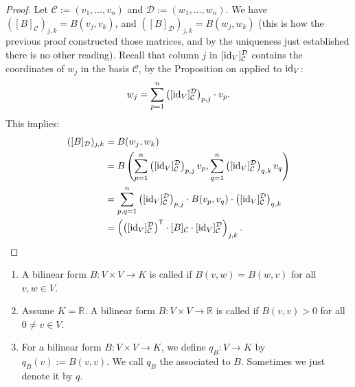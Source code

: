 \begin{proof}
Let $\mathcal{C} := (v_1, \dots, v_n)$ and $\mathcal{D} := (w_1, \dots, w_n)$. We have $([B]_{\mathcal{C}})_{j,k} = B(v_j, v_k)$, and $([B]_{\mathcal{D}})_{j,k} = B(w_j, w_k)$ (this is how the previous proof constructed those matrices, and by the uniqueness just established there is no other reading). Recall that column $j$ in $[\operatorname{id}_V]_{\mathcal{C}}^{\mathcal{D}}$ contains the coordinates of $w_j$ in the basis $\mathcal{C}$, by the Proposition on  applied to $\operatorname{id}_V$:
\[
w_j = \sum_{p=1}^n \left([\operatorname{id}_V]_{\mathcal{C}}^{\mathcal{D}}\right)_{p,j} \cdot v_p.
\]
This implies:
\begin{align*}
([B]_{\mathcal{D}})_{j,k} &= B(w_j, w_k) \\
&= B\left(\sum_{p=1}^n \left([\operatorname{id}_V]_{\mathcal{C}}^{\mathcal{D}}\right)_{p,j} v_p, \sum_{q=1}^n \left([\operatorname{id}_V]_{\mathcal{C}}^{\mathcal{D}}\right)_{q,k} v_q\right) \\
&= \sum_{p,q=1}^n \left([\operatorname{id}_V]_{\mathcal{C}}^{\mathcal{D}}\right)_{p,j} \cdot B(v_p, v_q) \cdot \left([\operatorname{id}_V]_{\mathcal{C}}^{\mathcal{D}}\right)_{q,k} \\
&= \left(\left([\operatorname{id}_V]_{\mathcal{C}}^{\mathcal{D}}\right)^{\mathsf{T}} \cdot [B]_{\mathcal{C}} \cdot [\operatorname{id}_V]_{\mathcal{C}}^{\mathcal{D}}\right)_{j,k}.
\end{align*}
\end{proof}

\begin{definition}
\label{def:symmetric_positive_definite_quadratic}
\leavevmode
\begin{enumerate}[label=\textbf{(\alph*)}]
    \item A bilinear form $B \colon V \times V \to K$ is called  if $B(v, w) = B(w, v)$ for all $v, w \in V$.
    \item Assume $K = \mathbb{R}$. A bilinear form $B \colon V \times V \to \mathbb{R}$ is called  if $B(v, v) > 0$ for all $0 \neq v \in V$.
    \item For a bilinear form $B \colon V \times V \to K$, we define $q_B \colon V \to K$ by $q_B(v) := B(v, v)$. We call $q_B$ the  associated to $B$. Sometimes we just denote it by $q$.
\end{enumerate}
\end{definition}

